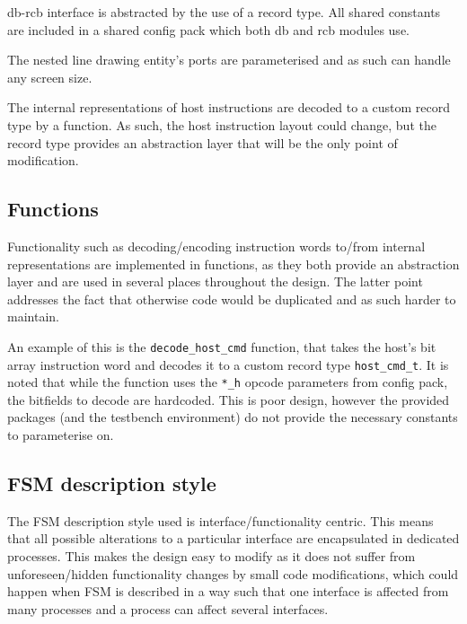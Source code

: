 \documentclass[]{article}
\begin{document}
db-rcb interface is abstracted by the use of a record type. All shared constants are included in a shared config pack which both db and rcb modules use.

The nested line drawing entity's ports are parameterised and as such can handle any screen size.

The internal representations of host instructions are decoded to a custom record type by a function. As such, the host instruction layout could change, but the record type provides an abstraction layer that will be the only point of modification.

\subsection{Functions} %
\label{sub:functions}


Functionality such as decoding/encoding instruction words to/from internal representations are implemented in functions, as they both provide an abstraction layer and are used in several places throughout the design. The latter point addresses the fact that otherwise code would be duplicated and as such harder to maintain.

An example of this is the \verb"decode_host_cmd" function, that takes the host's bit array instruction word and decodes it to a custom record type \verb"host_cmd_t". It is noted that while the function uses the \verb"*_h" opcode parameters from config pack, the bitfields to decode are hardcoded. This is poor design, however the provided packages (and the testbench environment) do not provide the necessary constants to parameterise on.

\subsection{FSM description style} %
\label{sub:fsm_description_style}


The FSM description style used is interface/functionality centric. This means that all possible alterations to a particular interface are encapsulated in dedicated processes. This makes the design easy to modify as it does not suffer from unforeseen/hidden functionality changes by small code modifications, which could happen when FSM is described in a way such that one interface is affected from many processes and a process can affect several interfaces.
\end{document}
